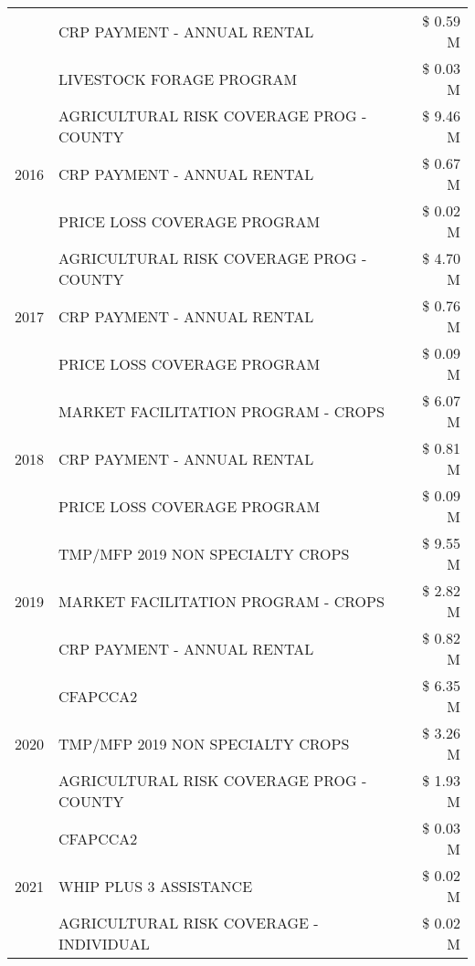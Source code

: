 \begin{tabular}{llr}
 & CRP PAYMENT - ANNUAL RENTAL & \$ 0.59 M \\
 & LIVESTOCK FORAGE PROGRAM & \$ 0.03 M \\
\cline{1-3}
\multirow[t]{3}{*}{2016} & AGRICULTURAL RISK COVERAGE PROG - COUNTY      & \$ 9.46 M \\
 & CRP PAYMENT - ANNUAL RENTAL                   & \$ 0.67 M \\
 & PRICE LOSS COVERAGE PROGRAM                   & \$ 0.02 M \\
\cline{1-3}
\multirow[t]{3}{*}{2017} & AGRICULTURAL RISK COVERAGE PROG - COUNTY & \$ 4.70 M \\
 & CRP PAYMENT - ANNUAL RENTAL & \$ 0.76 M \\
 & PRICE LOSS COVERAGE PROGRAM & \$ 0.09 M \\
\cline{1-3}
\multirow[t]{3}{*}{2018} & MARKET FACILITATION PROGRAM - CROPS & \$ 6.07 M \\
 & CRP PAYMENT - ANNUAL RENTAL & \$ 0.81 M \\
 & PRICE LOSS COVERAGE PROGRAM & \$ 0.09 M \\
\cline{1-3}
\multirow[t]{3}{*}{2019} & TMP/MFP 2019 NON SPECIALTY CROPS & \$ 9.55 M \\
 & MARKET FACILITATION PROGRAM - CROPS & \$ 2.82 M \\
 & CRP PAYMENT - ANNUAL RENTAL & \$ 0.82 M \\
\cline{1-3}
\multirow[t]{3}{*}{2020} & CFAPCCA2 & \$ 6.35 M \\
 & TMP/MFP 2019 NON SPECIALTY CROPS & \$ 3.26 M \\
 & AGRICULTURAL RISK COVERAGE PROG - COUNTY & \$ 1.93 M \\
\cline{1-3}
\multirow[t]{3}{*}{2021} & CFAPCCA2 & \$ 0.03 M \\
 & WHIP PLUS 3 ASSISTANCE & \$ 0.02 M \\
 & AGRICULTURAL RISK COVERAGE - INDIVIDUAL & \$ 0.02 M \\
\cline{1-3}
\bottomrule
\end{tabular}

